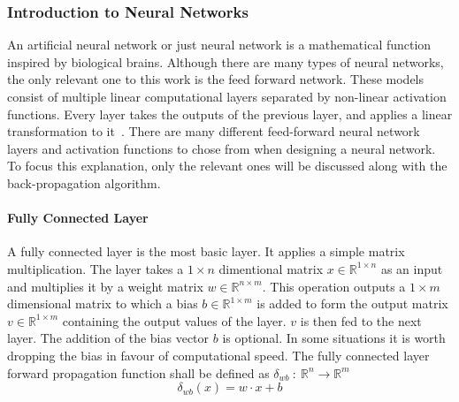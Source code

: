 \documentclass[12pt]{article}
\begin{document}
\subsubsection{Introduction to Neural Networks}
An artificial neural network or just neural network is a mathematical function inspired by biological brains. Although there are many types of neural networks, the only relevant one to this work is the feed forward network. These models consist of multiple linear computational layers separated by non-linear activation functions. Every layer takes the outputs of the previous layer, and applies a linear transformation to it~\cite{zhang2018artificial}. There are many different feed-forward neural network layers and activation functions to chose from when designing a neural network. To focus this explanation, only the relevant ones will be discussed along with the back-propagation algorithm.
\paragraph{Fully Connected Layer}
A fully connected layer is the most basic layer. It applies a simple matrix multiplication. The layer takes a \(1 \times n\) dimentional matrix \(x \in \mathbb{R}^{1\times n}\) as an input and multiplies it by a weight matrix \(w \in\mathbb{R}^{n\times m}\). This operation outputs a \(1\times m\) dimensional matrix to which a bias \(b \in \mathbb{R}^{1 \times m}\) is added to form the output matrix \(v \in \mathbb{R}^{1 \times m}\) containing the output values of the layer. \(v\) is then fed to the next layer. The addition of the bias vector \(b\) is optional. In some situations it is worth dropping the bias in favour of computational speed. The fully connected layer forward propagation function shall be defined as \(\delta_{wb}~:~\mathbb{R}^n\to\mathbb{R}^m\)
\begin{equation} \label{eq:NN:fully_connected_layer_forward}
\delta_{wb}(x) = w \cdot x + b
\end{equation}
\end{document}
